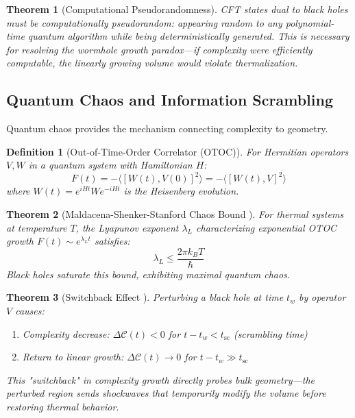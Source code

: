 \documentclass[11pt,a4paper]{article}
\newtheorem{theorem}{Theorem}[section]
\newtheorem{definition}{Definition}[section]
\theoremstyle{remark}
\theoremstyle{definition}
\begin{document}
\begin{theorem}[Computational Pseudorandomness]
\label{thm:pseudorandomness}
CFT states dual to black holes must be computationally pseudorandom: appearing random to any polynomial-time quantum algorithm while being deterministically generated. This is necessary for resolving the wormhole growth paradox—if complexity were efficiently computable, the linearly growing volume would violate thermalization.
\end{theorem}

\subsection{Quantum Chaos and Information Scrambling}

Quantum chaos provides the mechanism connecting complexity to geometry.

\begin{definition}[Out-of-Time-Order Correlator (OTOC)]
For Hermitian operators $V, W$ in a quantum system with Hamiltonian $H$:
\begin{equation}
F(t) = -\langle [W(t), V(0)]^2 \rangle = -\langle [W(t), V]^2 \rangle
\end{equation}
where $W(t) = e^{iHt} W e^{-iHt}$ is the Heisenberg evolution.
\end{definition}

\begin{theorem}[Maldacena-Shenker-Stanford Chaos Bound \cite{Maldacena2016}]
For thermal systems at temperature $T$, the Lyapunov exponent $\lambda_L$ characterizing exponential OTOC growth $F(t) \sim e^{\lambda_L t}$ satisfies:
\begin{equation}
\lambda_L \leq \frac{2\pi k_B T}{\hbar}
\end{equation}
Black holes saturate this bound, exhibiting maximal quantum chaos.
\end{theorem}

\begin{theorem}[Switchback Effect \cite{Stanford2014}]
Perturbing a black hole at time $t_w$ by operator $V$ causes:
\begin{enumerate}[label=(\roman*)]
\item Complexity decrease: $\Delta \mathcal{C}(t) < 0$ for $t - t_w < t_{\text{sc}}$ (scrambling time)
\item Return to linear growth: $\Delta \mathcal{C}(t) \to 0$ for $t - t_w \gg t_{\text{sc}}$
\end{enumerate}
This "switchback" in complexity growth directly probes bulk geometry—the perturbed region sends shockwaves that temporarily modify the volume before restoring thermal behavior.
\end{theorem}
\end{document}
